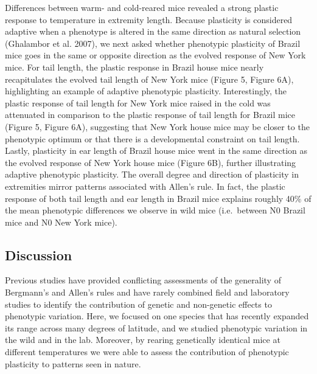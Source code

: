 \documentclass[]{article}
\begin{document}
Differences between warm- and cold-reared mice revealed a strong plastic
response to temperature in extremity length. Because plasticity is
considered adaptive when a phenotype is altered in the same direction as
natural selection (Ghalambor et al. 2007), we next asked whether
phenotypic plasticity of Brazil mice goes in the same or opposite
direction as the evolved response of New York mice. For tail length, the
plastic response in Brazil house mice nearly recapitulates the evolved
tail length of New York mice (Figure 5, Figure 6A), highlighting an
example of adaptive phenotypic plasticity. Interestingly, the plastic
response of tail length for New York mice raised in the cold was
attenuated in comparison to the plastic response of tail length for
Brazil mice (Figure 5, Figure 6A), suggesting that New York house mice
may be closer to the phenotypic optimum or that there is a developmental
constraint on tail length. Lastly, plasticity in ear length of Brazil
house mice went in the same direction as the evolved response of New
York house mice (Figure 6B), further illustrating adaptive phenotypic
plasticity. The overall degree and direction of plasticity in
extremities mirror patterns associated with Allen's rule. In fact, the
plastic response of both tail length and ear length in Brazil mice
explains roughly 40\% of the mean phenotypic differences we observe in
wild mice (i.e.~between N0 Brazil mice and N0 New York mice).

\vspace{5mm}

\hypertarget{discussion}{%
\subsection{Discussion}\label{discussion}}

Previous studies have provided conflicting assessments of the generality
of Bergmann's and Allen's rules and have rarely combined field and
laboratory studies to identify the contribution of genetic and
non-genetic effects to phenotypic variation. Here, we focused on one
species that has recently expanded its range across many degrees of
latitude, and we studied phenotypic variation in the wild and in the
lab. Moreover, by rearing genetically identical mice at different
temperatures we were able to assess the contribution of phenotypic
plasticity to patterns seen in nature.
\end{document}
